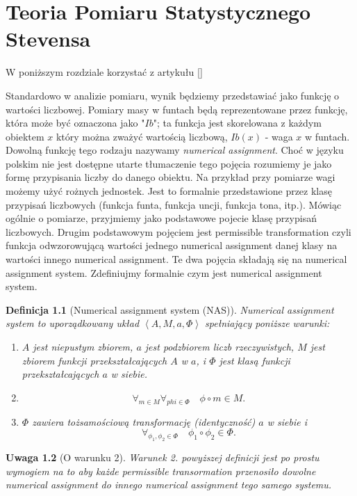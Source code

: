 \documentclass[12pt,a4paper]{report}
\newtheorem{definition}{Definicja}[chapter]
\newtheorem{remark}[definition]{Uwaga}
\newcommand{\tuple}[1]{\left\langle {#1} \right\rangle}
\begin{document}
\chapter{Teoria Pomiaru Statystycznego Stevensa}

W poniższym rozdziale korzystać z artykułu [{\citep{adams1965theory}}]

Standardowo w analizie pomiaru, wynik będziemy przedstawiać jako funkcję o wartości liczbowej. Pomiary masy w funtach będą reprezentowane przez funkcję, która może być oznaczona jako "$Ib$";  ta funkcja jest skorelowana z każdym obiektem $x$ który można zważyć wartością liczbową, $Ib(x)$ - waga $x$ w funtach. Dowolną funkcję tego rodzaju nazywamy \textit{numerical assignment}. Choć w języku polskim nie jest dostępne utarte tłumaczenie tego pojęcia rozumiemy je jako formę przypisania liczby do danego obiektu. Na przykład przy pomiarze wagi możemy użyć rożnych jednostek. Jest to formalnie przedstawione  przez klasę przypisań liczbowych (funkcja funta, funkcja uncji, funkcja tona, itp.). Mówiąc ogólnie o pomiarze, przyjmiemy jako podstawowe pojecie klasę przypisań liczbowych. Drugim podstawowym pojęciem jest permissible transformation czyli funkcja odwzorowującą wartości jednego numerical assignment danej klasy na wartości innego numerical assignment. Te dwa pojęcia składają się na numerical assignment system. Zdefiniujmy formalnie czym jest numerical assignment system.
\begin{definition}[Numerical assignment system (NAS)]
Numerical assignment system to uporządkowany układ $\tuple{A, M, a, \Phi}$ spełniający poniższe warunki:
\begin{enumerate}
\item
$A$ jest niepustym zbiorem, $a$ jest podzbiorem liczb rzeczywistych, $M$ jest zbiorem funkcji przekształcających $A$ w $a$, i $\Phi$ jest klasą funkcji przekształcających $a$ w siebie.  
\item
$$
\forall_{m \in M} \forall_{phi \in \Phi} \quad \phi \circ m \in M.
$$ 
\item
$\Phi$ zawiera tożsamościową transformację (identyczność) $a$ w siebie i 
$$
\forall_{\phi_{1}, \phi_{2} \in \Phi} \quad \phi_{1} \circ \phi_{2} \in \Phi.
$$

\end{enumerate}

\end{definition}

\begin{remark}[O warunku 2]
Warunek 2. powyższej definicji jest po prostu wymogiem na to aby każde permissible transormation przenosiło dowolne numerical assignment do innego numerical assignment tego samego systemu.
\end{remark}
\end{document}
